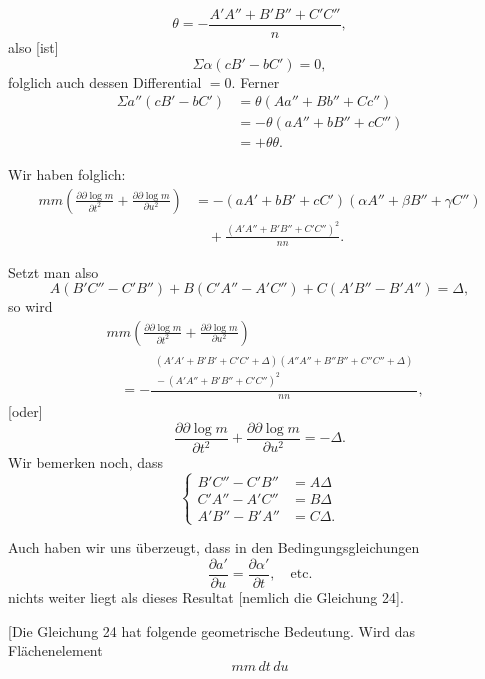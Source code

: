 %
\[
\theta=-\frac{A'A''+B'B''+C'C''}{n},
\]
also [ist]
\[
\Sigma\alpha(cB'-bC')=0,
\]
folglich auch dessen Differential $=0$. Ferner
\[
\begin{aligned}
\Sigma a''(cB'-bC')&=\theta(Aa''+Bb''+Cc'')\\
&=-\theta(aA''+bB''+cC'')\\
&=+\theta\theta.
\end{aligned}
\]
\par\indent Wir haben folglich:
\[
\begin{aligned}
mm\left(\frac{\partial\partial\log m}{\partial t^2}+\frac{\partial\partial\log m}{\partial u^2}\right)
&=-(aA'+bB'+cC')(\alpha A''+\beta B''+\gamma C'')\\
&\quad+\frac{(A'A''+B'B''+C'C'')^2}{nn}.
\end{aligned}
\]
\par\indent Setzt man also
\[
A(B'C''-C'B'')+B(C'A''-A'C'')+C(A'B''-B'A'')=\Delta,
\]
so wird
\[
\begin{aligned}
&mm\left(\frac{\partial\partial\log m}{\partial t^2}+\frac{\partial\partial\log m}{\partial u^2}\right)\\
&\quad=-\frac{\begin{gathered}(A'A'+B'B'+C'C'+\Delta)(A''A''+B''B''+C''C''+\Delta)\\[-2pt]{}-(A'A''+B'B''+C'C'')^2\end{gathered}}{nn},
\end{aligned}
\]
[oder]
\begin{equation}\tag*{[24]}
\frac{\partial\partial\log m}{\partial t^2}+\frac{\partial\partial\log m}{\partial u^2}=-\Delta.
\end{equation}
Wir bemerken noch, dass
\begin{equation}\tag*{$(\FourRingCross)$}
\left\{\begin{aligned}
B'C''-C'B''&=A\Delta\\
C'A''-A'C''&=B\Delta\\
A'B''-B'A''&=C\Delta.
\end{aligned}\right.
\end{equation}
\par\indent Auch haben wir uns überzeugt, dass in den Bedingungsgleichungen
\[
\frac{\partial a'}{\partial u}=\frac{\partial\alpha'}{\partial t},\quad\text{etc.}
\]
nichts weiter liegt als dieses Resultat [nemlich die Gleichung 24].

[Die Gleichung 24 hat folgende geometrische Bedeutung. Wird das Flächenelement
\[
mm\,dt\,du
\]
